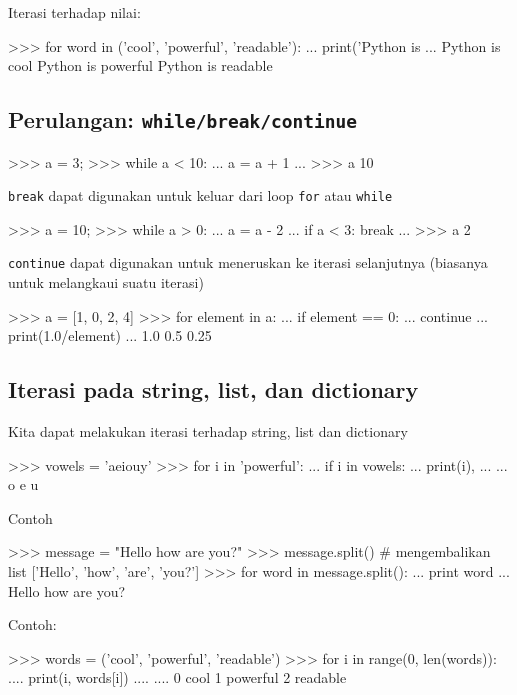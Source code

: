 \documentclass[a4paper,11pt]{extarticle}
\begin{document}
Iterasi terhadap nilai:
\begin{pyconcode}
>>> for word in ('cool', 'powerful', 'readable'):
...     print('Python is %
...
Python is cool
Python is powerful
Python is readable
\end{pyconcode}

\subsection{Perulangan: \texttt{while/break/continue}}

\begin{pyconcode}
>>> a = 3;
>>> while a < 10:
...     a = a + 1
... 
>>> a
10
\end{pyconcode}

\texttt{break} dapat digunakan untuk
keluar dari loop \texttt{for} atau \texttt{while}
\begin{pyconcode}
>>> a = 10;
>>> while a > 0:
...     a = a - 2
...     if a < 3: break
... 
>>> a
2
\end{pyconcode}


\texttt{continue} dapat digunakan untuk meneruskan ke
iterasi selanjutnya (biasanya untuk melangkaui suatu iterasi)
\begin{pyconcode}
>>> a = [1, 0, 2, 4]
>>> for element in a:
...     if element == 0:
...         continue
...     print(1.0/element)
...     
1.0
0.5
0.25
\end{pyconcode}


\subsection{Iterasi pada string, list, dan dictionary}

Kita dapat melakukan iterasi terhadap string, list dan dictionary
\begin{pyconcode}
>>> vowels = 'aeiouy'
>>> for i in 'powerful':
...     if i in vowels:
...         print(i),
...         
...         
o e u
\end{pyconcode}

Contoh
\begin{pyconcode}
>>> message = "Hello how are you?"
>>> message.split() # mengembalikan list
['Hello', 'how', 'are', 'you?']
>>> for word in message.split():
...     print word
...     
Hello
how
are
you?
\end{pyconcode}

Contoh:
\begin{pyconcode}
>>> words = ('cool', 'powerful', 'readable')
>>> for i in range(0, len(words)):
....     print(i, words[i])
....     
....     
0 cool
1 powerful
2 readable
\end{pyconcode}
\end{document}
